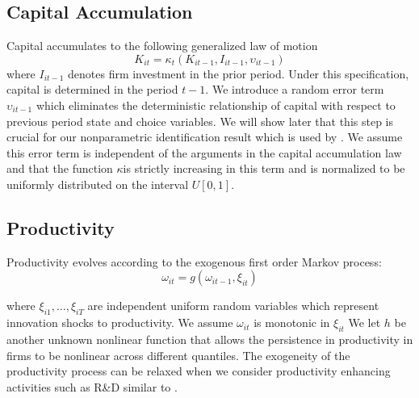 \documentclass{article}
\begin{document}
\subsection{Capital Accumulation}
Capital accumulates to the following generalized law of motion
\begin{equation} \label{modelK}
K_{it}=\kappa_{t}(K_{it-1}, I_{it-1}, \upsilon_{it-1})
\end{equation}
where $I_{it-1}$ denotes firm investment in the prior period. Under this specification, capital is determined in the period $t-1$. We introduce a random error term $\upsilon_{it-1}$ which eliminates the deterministic relationship of capital with respect to previous period state and choice variables. We will show later that this step is crucial for our nonparametric identification result which is used by \cite{Hu2019}. We assume this error term is independent of the arguments in the capital accumulation law and that the function $\kappa$is strictly increasing in this term and is normalized to be uniformly distributed on the interval $U[0,1]$.

\subsection{Productivity}
Productivity evolves according to the exogenous first order Markov process:
\begin{equation}\label{modelw}
\omega_{it}=g(\omega_{it-1}, \xi_{it})
\end{equation}

where $\xi_{i1},\dots, \xi_{iT}$ are independent uniform random variables which represent innovation shocks to productivity. We assume $\omega_{it}$ is monotonic in $\xi_{it}$ We let $h$ be another unknown nonlinear function that allows the persistence in productivity in firms to be nonlinear across different quantiles. The exogeneity of the productivity process can be relaxed when we consider productivity enhancing activities such as R\&D similar to \cite{Doraszelski2013}.
\end{document}
